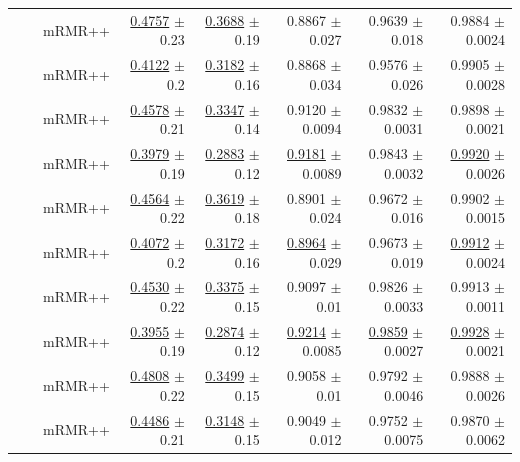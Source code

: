 \begin{longtable}{llp{}rrrrr}
 &  & mRMR++ & \underline{0.4757} {\scriptsize $\pm$ 0.23} & \underline{0.3688} {\scriptsize $\pm$ 0.19} & 0.8867 {\scriptsize $\pm$ 0.027} & 0.9639 {\scriptsize $\pm$ 0.018} & 0.9884 {\scriptsize $\pm$ 0.0024} \\
 &  & mRMR++ & \underline{0.4122} {\scriptsize $\pm$ 0.2} & \underline{0.3182} {\scriptsize $\pm$ 0.16} & 0.8868 {\scriptsize $\pm$ 0.034} & 0.9576 {\scriptsize $\pm$ 0.026} & 0.9905 {\scriptsize $\pm$ 0.0028} \\
 &  & mRMR++ & \underline{0.4578} {\scriptsize $\pm$ 0.21} & \underline{0.3347} {\scriptsize $\pm$ 0.14} & 0.9120 {\scriptsize $\pm$ 0.0094} & 0.9832 {\scriptsize $\pm$ 0.0031} & 0.9898 {\scriptsize $\pm$ 0.0021} \\
 &  & mRMR++ & \underline{0.3979} {\scriptsize $\pm$ 0.19} & \underline{0.2883} {\scriptsize $\pm$ 0.12} & \underline{0.9181} {\scriptsize $\pm$ 0.0089} & 0.9843 {\scriptsize $\pm$ 0.0032} & \underline{0.9920} {\scriptsize $\pm$ 0.0026} \\
 &  & mRMR++ & \underline{0.4564} {\scriptsize $\pm$ 0.22} & \underline{0.3619} {\scriptsize $\pm$ 0.18} & 0.8901 {\scriptsize $\pm$ 0.024} & 0.9672 {\scriptsize $\pm$ 0.016} & 0.9902 {\scriptsize $\pm$ 0.0015} \\
 &  & mRMR++ & \underline{0.4072} {\scriptsize $\pm$ 0.2} & \underline{0.3172} {\scriptsize $\pm$ 0.16} & \underline{0.8964} {\scriptsize $\pm$ 0.029} & 0.9673 {\scriptsize $\pm$ 0.019} & \underline{0.9912} {\scriptsize $\pm$ 0.0024} \\
 &  & mRMR++ & \underline{0.4530} {\scriptsize $\pm$ 0.22} & \underline{0.3375} {\scriptsize $\pm$ 0.15} & 0.9097 {\scriptsize $\pm$ 0.01} & 0.9826 {\scriptsize $\pm$ 0.0033} & 0.9913 {\scriptsize $\pm$ 0.0011} \\
 &  & mRMR++ & \underline{0.3955} {\scriptsize $\pm$ 0.19} & \underline{0.2874} {\scriptsize $\pm$ 0.12} & \underline{0.9214} {\scriptsize $\pm$ 0.0085} & \underline{0.9859} {\scriptsize $\pm$ 0.0027} & \underline{0.9928} {\scriptsize $\pm$ 0.0021} \\
 &  & mRMR++ & \underline{0.4808} {\scriptsize $\pm$ 0.22} & \underline{0.3499} {\scriptsize $\pm$ 0.15} & 0.9058 {\scriptsize $\pm$ 0.01} & 0.9792 {\scriptsize $\pm$ 0.0046} & 0.9888 {\scriptsize $\pm$ 0.0026} \\
 &  & mRMR++ & \underline{0.4486} {\scriptsize $\pm$ 0.21} & \underline{0.3148} {\scriptsize $\pm$ 0.15} & 0.9049 {\scriptsize $\pm$ 0.012} & 0.9752 {\scriptsize $\pm$ 0.0075} & 0.9870 {\scriptsize $\pm$ 0.0062} \\

\end{longtable}
